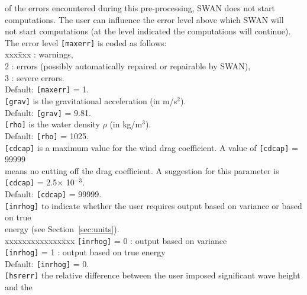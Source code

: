 \documentclass[12pt]{book}
\begin{document}
\begin{tabbing}
                   of the errors encountered during this pre-processing, SWAN does not start\\
                   computations. The user can influence the error level above which SWAN will\\
                   not start computations (at the level indicated the computations will continue).\\
                   The error level {\tt [maxerr]} is coded as follows:\\
                   \pushtabs
                   xxx\=xxx  \>: warnings,\\
                   2 \>: errors (possibly automatically repaired or repairable by SWAN),\\
                   3 \>: severe errors.\\
                   \poptabs
                   Default: {\tt [maxerr]} = 1.\-\\
{\tt [grav]}    \> is the gravitational acceleration (in m/s$^2$).\+\\
                   Default: {\tt [grav]} = 9.81.\-\\
{\tt [rho]}     \> is the water density $\rho$ (in kg/m$^3$).\+\\
                   Default: {\tt [rho]} = 1025.\-\\
{\tt [cdcap]}   \> is a maximum value for the wind drag coefficient. A value of {\tt [cdcap]} = 99999\+\\
                   means no cutting off the drag coefficient. A suggestion for this parameter is\\
                   {\tt [cdcap]} = 2.5$\times$ 10$^{-3}$.\\
                   Default: {\tt [cdcap]} = 99999.\-\\
{\tt [inrhog]}  \> to indicate whether the user requires output based on variance or based on true\+\\
                   energy (see Section~\ref{sec:units}).\\
                   \pushtabs
                   xxxxxxxxxxxxx\=xxx \kill
                   {\tt [inrhog]} = 0 \>: output based on variance\\
                   {\tt [inrhog]} = 1 \>: output based on true energy\\
                   \poptabs
                   Default: {\tt [inrhog]} = 0.\-\\
{\tt [hsrerr]}  \> the relative difference between the user imposed significant wave height and the\+\\

\end{tabbing}
\end{document}
